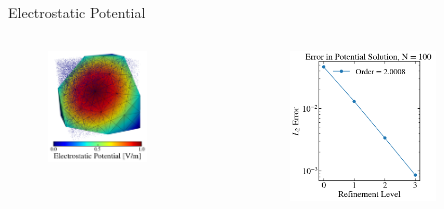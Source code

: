 \documentclass[aspectratio=169, 16pt]{beamer}
\begin{document}
\begin{frame}{Electrostatic Potential}
  \vfill{}
  \begin{columns}
    \begin{figure}[H]
      \includegraphics[width=0.7\textwidth]{figs/potential_visualiation.png}
     \end{figure}
    \begin{figure}[H]
      \includegraphics[width=0.8\textwidth]{figs/potential_error.png}
     \end{figure}
  \end{columns}
\end{frame}
\end{document}

